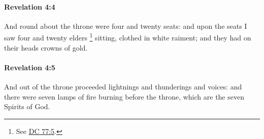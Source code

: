 		\paragraph{Revelation 4:4} %
			\label{REVELATIONNT-4-4}

			And round about the throne were four and twenty seats: and upon the seats I saw four and twenty elders%
				\footnote{%
					See \hyperref[DC77-5]{DC 77:5}.
					}
			sitting, clothed in white raiment; and they had on their heads crowns of gold.

			\begin{framed}
			\scriptsize
				\begin{compactdesc}
					\item[SBLG] 
				\end{compactdesc}
			\end{framed}

		\paragraph{Revelation 4:5} %
			\label{REVELATIONNT-4-5}

			And out of the throne proceeded lightnings and thunderings and voices: and there were seven lamps of fire burning before the throne, which are the seven Spirits of God.

